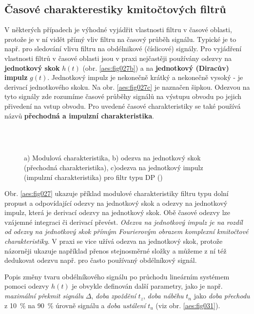     \subsection{Časové charakterestiky kmitočtových filtrů}  
      V některých případech je výhodné vyjádřit vlastnosti filtru v časové oblasti, protože je v ní
      vidět přímý vliv filtru na časový průběh signálu. Typické je to např. pro sledování vlivu
      filtru na obdélnikové (číslicové) signály. Pro vyjádření vlastnosti filtrů v časové oblasti
      jsou v praxi nejčastěji používány odezvy na \textbf{jednotkový skok} \(h(t)\) (obr.
      \ref{aes:fig027b}) a na \textbf{jednotkový (Diracův) impulz} \(g(t)\). Jednotkový impulz
      je nekonečně krátký a nekonečně vysoký - je derivací jednotkového skoku. Na obr.
      \ref{aes:fig027c} je naznačen šipkou. Odezvou na tyto signály zde rozumíme časové průběhy
      signálů na výstupu obvodu po jejich přivedení na vstup obvodu. Pro uvedené časové
      charakteristiky se také používá názvů \textbf{přechodná a impulzní charakteristika}. 

      \begin{figure}[ht!]
        \centering
          \\
          \\
        \caption{a) Modulová charakteristika, b) odezva na jednotkový skok (přechodná
                charakteristika), c)odezva na jednotkový impulz (impulzní charakteristika) pro filtr
                typu DP (\cite[s.~30]{HajekSedlacek2002})}
                \label{aes:fig030}
      \end{figure}
      
      Obr. \ref{aes:fig027} ukazuje příklad modulové charakteristiky filtru typu dolní propust a
      odpovídající odezvy na jednotkový skok a odezvy na jednotkový impulz, která je derivací odezvy
      na jednotkový skok. Obě časové odezvy lze vzájemné integraci či derivací převést. \emph{Odezva
      na jednotkový impulz je na rozdíl od odezvy na jednotkový skok přímým Fourierovým obrazem
      komplexní kmitočtové charakteristiky}. V praxi se vice užívá odezva na jednotkový skok,
      protože názorněji ukazuje například přenos stejnosměrné složky a můžeme z ní též dedukovat
      odezvu např. pro často používaný obdélníkový signál. 

      Popis změny tvaru obdélníkového signálu po průchodu lineárním systémem pomoci odezvy \(h(t)\)
      je obvykle definován další parametry, jako je např. \emph{maximální překmit signálu}
      \(\Delta\), \emph{doba zpoždění} \(t_z\), \emph{doba náběhu} \(t_n\) jako \emph{doba přechodu}
      z \SI{10}{\percent} na \SI{90}{\percent} úrovně signálu a \emph{doba ustálení} \(t_u\) (viz
      obr. \ref{aes:fig031}). 

